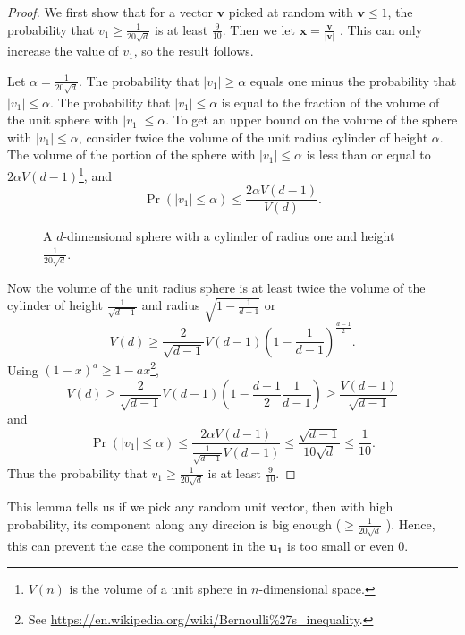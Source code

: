 \begin{proof}
  We first show that for a vector \(\mathbf{v} \) picked at random with \(\mathbf{v} \le 1\), the probability that \(v_1 \ge \frac{1}{20\sqrt{d} }\) is at least \(\frac{9}{10}\). Then we let \(\mathbf{x} = \frac{\mathbf{v} }{\vert \mathbf{v}  \vert }\) . This can only increase the value of \(v_1\), so the result follows. 
  
  Let \(\alpha  = \frac{1}{20\sqrt{d} }\). The probability that \(\vert v_1 \vert \ge \alpha \) equals one minus the probability that \(\vert v_1 \vert \le \alpha  \). The  probability that \(\vert v_1 \vert \le \alpha  \) is equal to the fraction of the volume of the unit sphere with \(\vert v_1 \vert \le \alpha  \). To get an upper bound on the volume of the sphere with \(\vert v_1 \vert \le \alpha  \), consider twice the volume of the unit radius cylinder of height \(\alpha \). The volume of the portion of the sphere with \(\vert v_1 \vert \le \alpha  \) is less than or equal to \(2 \alpha  V(d-1)\)\footnote{\(V(n)\) is the volume of a unit sphere in \(n\)-dimensional space.  }, and 
  \[
    \Pr(\vert v_1 \vert \le \alpha ) \le \frac{2 \alpha  V(d-1)}{V(d)} .
  \]

  \begin{figure}[H]
    \centering
    \caption{A \(d\)-dimensional sphere with a cylinder of radius one and height \(\frac{1}{20\sqrt{d} }\).  }
    \label{fig: d-dim_sphere}
  \end{figure}

  Now the volume of the unit radius sphere is at least twice the volume of the cylinder of height \(\frac{1}{\sqrt{d-1} }\) and radius \(\sqrt{1 - \frac{1}{d-1}} \) or 
  \[
    V(d) \ge \frac{2}{\sqrt{d-1} }V(d-1)\left( 1 - \frac{1}{d-1} \right)^{\frac{d-1}{2}}. 
  \]  
  Using \((1-x)^a \ge 1 - ax\)\footnote{See \url{https://en.wikipedia.org/wiki/Bernoulli\%27s_inequality}.},
  \[
    V(d) \ge \frac{2}{\sqrt{d-1} }V(d-1)\left( 1-\frac{d-1}{2}\frac{1}{d-1} \right) \ge \frac{V(d-1)}{\sqrt{d-1} }
  \]
  and 
  \[
    \Pr(\vert v_1 \vert \le \alpha  ) \le \frac{2\alpha  V(d-1)}{\frac{1}{\sqrt{d-1}}V(d-1)} \le \frac{\sqrt{d-1}}{10\sqrt{d} } \le \frac{1}{10}. 
  \]
  Thus the probability that \(v_1 \ge \frac{1}{20\sqrt{d} }\) is at least \(\frac{9}{10}\).  
\end{proof}

\begin{note}
  This lemma tells us if we pick any random unit vector, then with high probability, its component along any direcion is big enough (\(\ge \frac{1}{20\sqrt{d} }\) ). Hence, this can prevent the case the component in the \(\mathbf{\mathbf{u_1} } \) is too small or even \(0\).  
\end{note}


